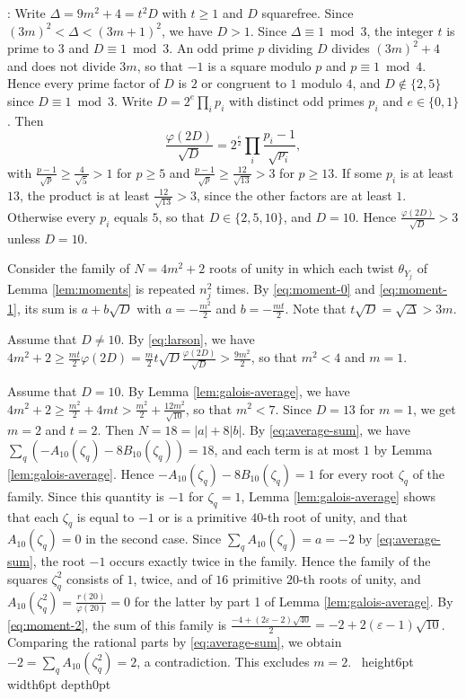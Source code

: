 \documentclass[leqno]{article}
\renewcommand{\geq}{\ensuremath{\geqslant}}
\newcommand{\qed}{\hfill \vrule height6pt  width6pt depth0pt}
\newcommand{\epsi}{\varepsilon}
\newenvironment{proof}[1][]{\noindent {\it Proof #1} : }{\hbox{~}\qed
\smallskip
}
\numberwithin{equation}{section}
\begin{document}
\begin{proof}
Write $\Delta = 9m^2+4 = t^2D$ with $t \geq 1$ and $D$ squarefree. Since $(3m)^2 < \Delta < (3m+1)^2$, we have $D > 1$. Since $\Delta \equiv 1 \bmod 3$, the integer $t$ is prime to $3$ and $D \equiv 1 \bmod 3$. An odd prime $p$ dividing $D$ divides $(3m)^2+4$ and does not divide $3m$, so that $-1$ is a square modulo $p$ and $p \equiv 1 \bmod 4$. Hence every prime factor of $D$ is $2$ or congruent to $1$ modulo $4$, and $D \notin \{2,5\}$ since $D \equiv 1 \bmod 3$. Write $D = 2^e\prod_i p_i$ with distinct odd primes $p_i$ and $e \in \{0,1\}$. Then
\[
\frac{\varphi(2D)}{\sqrt D} = 2^{\frac e2}\prod_i\frac{p_i-1}{\sqrt{p_i}},
\]
with $\frac{p-1}{\sqrt p} \geq \frac{4}{\sqrt 5} > 1$ for $p \geq 5$ and $\frac{p-1}{\sqrt p} \geq \frac{12}{\sqrt{13}} > 3$ for $p \geq 13$. If some $p_i$ is at least $13$, the product is at least $\frac{12}{\sqrt{13}} > 3$, since the other factors are at least $1$. Otherwise every $p_i$ equals $5$, so that $D \in \{2,5,10\}$, and $D = 10$. Hence $\frac{\varphi(2D)}{\sqrt D} > 3$ unless $D = 10$.

Consider the family of $N = 4m^2+2$ roots of unity in which each twist $\theta_{Y_j}$ of Lemma \ref{lem:moments} is repeated $n_j^2$ times. By \eqref{eq:moment-0} and \eqref{eq:moment-1}, its sum is $a+b\sqrt D$ with $a = -\frac{m^2}{2}$ and $b = -\frac{mt}{2}$. Note that $t\sqrt D = \sqrt\Delta > 3m$.

Assume that $D \neq 10$. By \eqref{eq:larson}, we have $4m^2+2 \geq \frac{mt}{2}\varphi(2D) = \frac m2  t\sqrt D \frac{\varphi(2D)}{\sqrt D} > \frac{9m^2}{2}$, so that $m^2 < 4$ and $m = 1$.

Assume that $D = 10$. By Lemma \ref{lem:galois-average}, we have $4m^2+2 \geq \frac{m^2}{2}+4mt > \frac{m^2}{2}+\frac{12m^2}{\sqrt{10}}$, so that $m^2 < 7$. Since $D = 13$ for $m = 1$, we get $m = 2$ and $t = 2$. Then $N = 18 = |a|+8|b|$. By \eqref{eq:average-sum}, we have $\sum_q(-A_{10}(\zeta_q)-8B_{10}(\zeta_q)) = 18$, and each term is at most $1$ by Lemma \ref{lem:galois-average}. Hence $-A_{10}(\zeta_q)-8B_{10}(\zeta_q) = 1$ for every root $\zeta_q$ of the family. Since this quantity is $-1$ for $\zeta_q = 1$, Lemma \ref{lem:galois-average} shows that each $\zeta_q$ is equal to $-1$ or is a primitive $40$-th root of unity, and that $A_{10}(\zeta_q) = 0$ in the second case. Since $\sum_q A_{10}(\zeta_q) = a = -2$ by \eqref{eq:average-sum}, the root $-1$ occurs exactly twice in the family. Hence the family of the squares $\zeta_q^2$ consists of $1$, twice, and of $16$ primitive $20$-th roots of unity, and $A_{10}(\zeta_q^2) = \frac{r(20)}{\varphi(20)} = 0$ for the latter by part 1 of Lemma \ref{lem:galois-average}. By \eqref{eq:moment-2}, the sum of this family is $\frac{-4+(2\epsi-2)\sqrt{40}}{2} = -2+2(\epsi-1)\sqrt{10}$. Comparing the rational parts by \eqref{eq:average-sum}, we obtain $-2 = \sum_q A_{10}(\zeta_q^2) = 2$, a contradiction. This excludes $m = 2$.
\end{proof}
\end{document}
